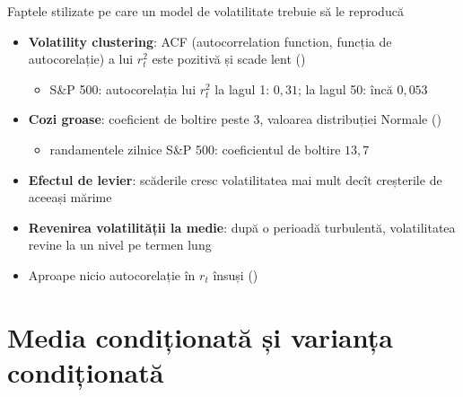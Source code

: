 \begin{frame}{Faptele stilizate pe care un model de volatilitate trebuie să le reproducă}
\itemsize{\small}
\begin{itemize}
    \item \textbf{Volatility clustering}: ACF (autocorrelation function, funcția de autocorelație) a lui $r_t^2$ este pozitivă și scade lent ()
    \begin{itemize}
        \item S\&P 500: autocorelația lui $r_t^2$ la lagul 1: $0{,}31$; la lagul 50: încă $0{,}053$
    \end{itemize}
    \item \textbf{Cozi groase}: coeficient de boltire peste 3, valoarea distribuției Normale ()
    \begin{itemize}
        \item randamentele zilnice S\&P 500: coeficientul de boltire $13{,}7$
    \end{itemize}
    \item \textbf{Efectul de levier}: scăderile cresc volatilitatea mai mult decît creșterile de aceeași mărime 
    \item \textbf{Revenirea volatilității la medie}: după o perioadă turbulentă, volatilitatea revine la un nivel pe termen lung
    \item Aproape nicio autocorelație în $r_t$ însuși ()
\end{itemize}
\end{frame}


\section{Media condiționată și varianța condiționată}

